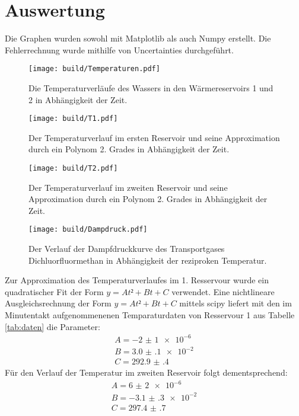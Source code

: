 \section{Auswertung}
\label{sec:Auswertung}
Die Graphen wurden sowohl mit Matplotlib\cite{matplotlib} als auch Numpy\cite{numpy} erstellt. Die
 Fehlerrechnung wurde mithilfe von Uncertainties\cite{uncertainties} durchgeführt.
 \begin{figure}
 	\centering
 	\caption{Die Temperaturverläufe des Wassers in den Wärmereservoirs 1 und 2 in Abhängigkeit der Zeit.}
 	\texttt{[image: build/Temperaturen.pdf]}
 	\label{fig:Graph1}
 \end{figure}
 \begin{figure}
 	\centering
 	\caption{Der Temperaturverlauf im ersten Reservoir und seine Approximation durch ein Polynom 2. Grades in Abhängigkeit der Zeit.}
 	\texttt{[image: build/T1.pdf]}
 	\label{fig:Graph1}
 \end{figure}
 \begin{figure}
 	\centering
 	\caption{Der Temperaturverlauf im zweiten Reservoir und seine Approximation durch ein Polynom 2. Grades in Abhängigkeit der Zeit.}
 	\texttt{[image: build/T2.pdf]}
 	\label{fig:Graph1}
 \end{figure}
 \begin{figure}
 	\centering
 	\caption{Der Verlauf der Dampfdruckkurve des Transportgases Dichluorfluormethan in Abhängigkeit der reziproken Temperatur.}
 	\texttt{[image: build/Dampdruck.pdf]}
 	\label{fig:Graph1}
 \end{figure}




 Zur Approximation des Temperaturverlaufes im 1. Resservour wurde ein
 quadratischer Fit der Form $y = At²+Bt+C$ verwendet. Eine nichtlineare
 Ausgleichsrechnung der Form $y = At²+Bt+C$ mittels scipy\cite{scipy} liefert mit den im Minutentakt
 aufgenommenenen Temparaturdaten von Resservour 1 aus Tabelle \ref{tab:daten}
 die Parameter:
 \begin{displaymath}
\begin{aligned}
 A = \num{-2(1)e-6}\\
 B = \num{3.0(1)e-2}\\
 C = \num{292.9(4)}
 \end{aligned}
 \end{displaymath}
 Für den Verlauf der Temperatur im zweiten Reservoir folgt dementsprechend:
 \begin{displaymath}
\begin{aligned}
 A = \num{6(2)e-6}\\
 B = \num{-3.1(3)e-2}\\
 C = \num{297.4(7)}
 \end{aligned}
 \end{displaymath}

